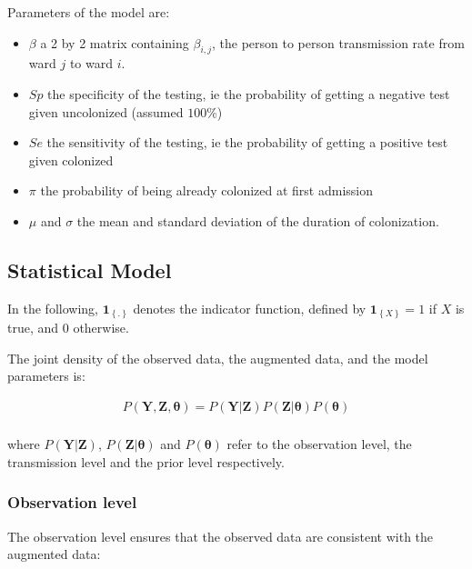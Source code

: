 \documentclass[10pt]{article}
\begin{document}
\begin{flushleft}
Parameters of the model are: 
\begin{itemize}
	\item $\beta$ a 2 by 2 matrix containing $\beta_{i,j}$, the person to person transmission rate from ward $j$ to ward $i$.
	\item $Sp$ the specificity of the testing, ie the probability of getting a negative test given uncolonized (assumed $100\%$)
	\item $Se$ the sensitivity of the testing, ie the probability of getting a positive test given colonized
	\item $\pi$ the probability of being already colonized at first admission
	\item $\mu$ and $\sigma$ the mean and standard deviation of the duration of colonization.
\end{itemize}

\subsection*{Statistical Model}

In the following, $\mathbf{1}_{\left\lbrace.\right\rbrace}$ denotes the indicator function, defined by $\mathbf{1}_{\left\lbrace X \right\rbrace}=1$ if $X$ is true, and $0$ otherwise.

The joint density of the observed data, the augmented data, and the model parameters is: 

\begin{equation} \label {JointDensity}
\begin{split}
P\left(\bm{Y},\bm{Z},\bm{\theta}\right) = P\left(\bm{Y}|\bm{Z}\right)P\left(\bm{Z}|\bm{\theta}\right)P\left(\bm{\theta}\right)\\ \nonumber
\end{split}
\end{equation}

\noindent where $P\left(\bm{Y}|\bm{Z}\right)$, $P\left(\bm{Z}|\bm{\theta}\right)$ 
and $P\left(\bm{\theta}\right)$ refer to the observation level, the transmission level
 and the prior level respectively.


\subsubsection*{Observation level}


The observation level ensures that the observed data are consistent with the augmented data:


\end{flushleft}
\end{document}
